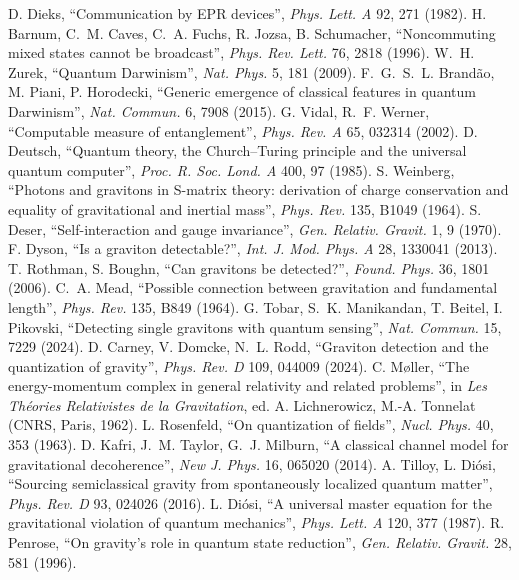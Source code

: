  D. Dieks, ``Communication by EPR devices'', \emph{Phys. Lett. A} 92, 271 (1982).
 H. Barnum, C.~M. Caves, C.~A. Fuchs, R. Jozsa, B. Schumacher, ``Noncommuting mixed states cannot be broadcast'',
\emph{Phys. Rev. Lett.} 76, 2818 (1996).
 W.~H. Zurek, ``Quantum Darwinism'', \emph{Nat. Phys.} 5, 181 (2009).
 F.~G.~S.~L. Brand\~ao, M. Piani, P. Horodecki, ``Generic emergence of classical features in quantum Darwinism'',
\emph{Nat. Commun.} 6, 7908 (2015).
 G. Vidal, R.~F. Werner, ``Computable measure of entanglement'', \emph{Phys. Rev. A} 65, 032314 (2002).
 D. Deutsch, ``Quantum theory, the Church--Turing principle and the universal quantum computer'', \emph{Proc. R. Soc.
Lond. A} 400, 97 (1985).
 S. Weinberg, ``Photons and gravitons in S-matrix theory: derivation of charge conservation and equality of
gravitational and inertial mass'', \emph{Phys. Rev.} 135, B1049 (1964).
 S. Deser, ``Self-interaction and gauge invariance'', \emph{Gen. Relativ. Gravit.} 1, 9 (1970).
 F. Dyson, ``Is a graviton detectable?'', \emph{Int. J. Mod. Phys. A} 28, 1330041 (2013).
 T. Rothman, S. Boughn, ``Can gravitons be detected?'', \emph{Found. Phys.} 36, 1801 (2006).
 C.~A. Mead, ``Possible connection between gravitation and fundamental length'', \emph{Phys. Rev.} 135, B849 (1964).
 G. Tobar, S.~K. Manikandan, T. Beitel, I. Pikovski, ``Detecting single gravitons with quantum sensing'', \emph{Nat.
Commun.} 15, 7229 (2024).
 D. Carney, V. Domcke, N.~L. Rodd, ``Graviton detection and the quantization of gravity'', \emph{Phys. Rev. D} 109, 044009
(2024).
 C. M{\o}ller, ``The energy-momentum complex in general relativity and related problems'', in \emph{Les Th\'eories
Relativistes de la Gravitation}, ed. A. Lichnerowicz, M.-A. Tonnelat (CNRS, Paris, 1962).
 L. Rosenfeld, ``On quantization of fields'', \emph{Nucl. Phys.} 40, 353 (1963).
 D. Kafri, J.~M. Taylor, G.~J. Milburn, ``A classical channel model for gravitational decoherence'', \emph{New J. Phys.} 16,
065020 (2014).
 A. Tilloy, L. Di\'osi, ``Sourcing semiclassical gravity from spontaneously localized quantum matter'', \emph{Phys.
Rev. D} 93, 024026 (2016).
 L. Di\'osi, ``A universal master equation for the gravitational violation of quantum mechanics'', \emph{Phys. Lett. A}
120, 377 (1987).
 R. Penrose, ``On gravity's role in quantum state reduction'', \emph{Gen. Relativ. Gravit.} 28, 581 (1996).
